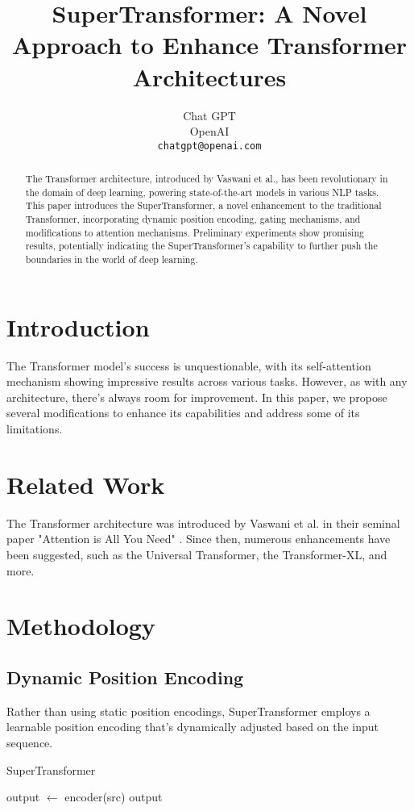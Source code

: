 \documentclass{article}
\title{SuperTransformer: A Novel Approach to Enhance Transformer Architectures}
\author{
  Chat GPT \\
  OpenAI \\
  \texttt{chatgpt@openai.com} \\
}
\begin{document}
\maketitle

\begin{abstract}
The Transformer architecture, introduced by Vaswani et al., has been revolutionary in the domain of deep learning, powering state-of-the-art models in various NLP tasks. This paper introduces the SuperTransformer, a novel enhancement to the traditional Transformer, incorporating dynamic position encoding, gating mechanisms, and modifications to attention mechanisms. Preliminary experiments show promising results, potentially indicating the SuperTransformer's capability to further push the boundaries in the world of deep learning.
\end{abstract}

\section{Introduction}
The Transformer model's success is unquestionable, with its self-attention mechanism showing impressive results across various tasks. However, as with any architecture, there's always room for improvement. In this paper, we propose several modifications to enhance its capabilities and address some of its limitations.

\section{Related Work}
The Transformer architecture was introduced by Vaswani et al. in their seminal paper "Attention is All You Need" \cite{vaswani2017}. Since then, numerous enhancements have been suggested, such as the Universal Transformer, the Transformer-XL, and more.

\section{Methodology}
\subsection{Dynamic Position Encoding}
Rather than using static position encodings, SuperTransformer employs a learnable position encoding that's dynamically adjusted based on the input sequence.

\begin{algorithm}
\caption{SuperTransformer}
\begin{algorithmic}[1]
    \State output $\leftarrow$ encoder(src)
    \Return output
\EndProcedure
\end{algorithmic}
\end{algorithm}
\end{document}
